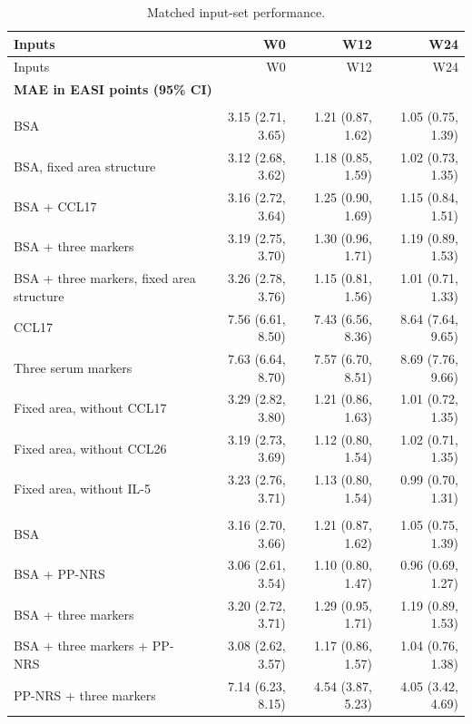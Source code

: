 {\small\renewcommand{\arraystretch}{0.94}\setlength{\tabcolsep}{4pt}
\begin{longtable}{p{53mm}rrr}
\caption{Matched input-set performance.}\label{tab:input_ablation}\\
\toprule Inputs & W0 & W12 & W24 \\ \midrule\endfirsthead
\toprule Inputs & W0 & W12 & W24 \\ \midrule\endhead
\multicolumn{4}{l}{\textbf{MAE in EASI points (95\% CI)}} \\ \addlinespace
\multicolumn{4}{l}{Complete core population; n=152/89/75} \\
BSA & 3.15 (2.71, 3.65) & 1.21 (0.87, 1.62) & 1.05 (0.75, 1.39) \\
BSA, fixed area structure & 3.12 (2.68, 3.62) & 1.18 (0.85, 1.59) & 1.02 (0.73, 1.35) \\
BSA + CCL17 & 3.16 (2.72, 3.64) & 1.25 (0.90, 1.69) & 1.15 (0.84, 1.51) \\
BSA + three markers & 3.19 (2.75, 3.70) & 1.30 (0.96, 1.71) & 1.19 (0.89, 1.53) \\
BSA + three markers, fixed area structure & 3.26 (2.78, 3.76) & 1.15 (0.81, 1.56) & 1.01 (0.71, 1.33) \\
CCL17 & 7.56 (6.61, 8.50) & 7.43 (6.56, 8.36) & 8.64 (7.64, 9.65) \\
Three serum markers & 7.63 (6.64, 8.70) & 7.57 (6.70, 8.51) & 8.69 (7.76, 9.66) \\
Fixed area, without CCL17 & 3.29 (2.82, 3.80) & 1.21 (0.86, 1.63) & 1.01 (0.72, 1.35) \\
Fixed area, without CCL26 & 3.19 (2.73, 3.69) & 1.12 (0.80, 1.54) & 1.02 (0.71, 1.35) \\
Fixed area, without IL-5 & 3.23 (2.76, 3.71) & 1.13 (0.80, 1.54) & 0.99 (0.70, 1.31) \\
\addlinespace
\multicolumn{4}{l}{Matched current-itch population; n=151/89/75} \\
BSA & 3.16 (2.70, 3.66) & 1.21 (0.87, 1.62) & 1.05 (0.75, 1.39) \\
BSA + PP-NRS & 3.06 (2.61, 3.54) & 1.10 (0.80, 1.47) & 0.96 (0.69, 1.27) \\
BSA + three markers & 3.20 (2.72, 3.71) & 1.29 (0.95, 1.71) & 1.19 (0.89, 1.53) \\
BSA + three markers + PP-NRS & 3.08 (2.62, 3.57) & 1.17 (0.86, 1.57) & 1.04 (0.76, 1.38) \\
PP-NRS + three markers & 7.14 (6.23, 8.15) & 4.54 (3.87, 5.23) & 4.05 (3.42, 4.69) \\

\end{longtable}}
